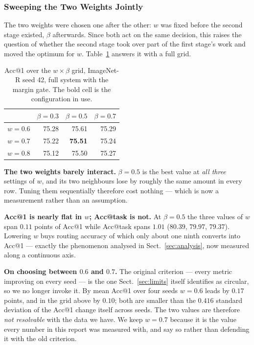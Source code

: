 \documentclass[11pt,a4paper]{article}
\begin{document}
\subsubsection{Sweeping the Two Weights Jointly}

The two weights were chosen one after the other: $w$ was fixed before the second
stage existed, $\beta$ afterwards. Since both act on the same decision, this
raises the question of whether the second stage took over part of the first
stage's work and moved the optimum for $w$. Table~\ref{tab:joint} answers it
with a full grid.

\begin{table}[htbp]
\centering
\caption{Acc@1 over the $w \times \beta$ grid, ImageNet-R seed 42, full system
with the margin gate. The bold cell is the configuration in use.}
\label{tab:joint}
\begin{tabular}{@{}lrrr@{}}
\toprule
 & $\beta = 0.3$ & $\beta = 0.5$ & $\beta = 0.7$ \\
\midrule
$w = 0.6$ & 75.28 & 75.61 & 75.29 \\
$w = 0.7$ & 75.22 & \textbf{75.51} & 75.24 \\
$w = 0.8$ & 75.12 & 75.50 & 75.27 \\
\bottomrule
\end{tabular}
\end{table}

\textbf{The two weights barely interact.} $\beta = 0.5$ is the best value at
\emph{all three} settings of $w$, and its two neighbours lose by roughly the same
amount in every row. Tuning them sequentially therefore cost nothing --- which is
now a measurement rather than an assumption.

\textbf{Acc@1 is nearly flat in $w$; Acc@task is not.} At $\beta = 0.5$ the three
values of $w$ span $0.11$ points of Acc@1 while Acc@task spans $1.01$ ($80.39$,
$79.97$, $79.37$). Lowering $w$ buys routing accuracy of which only about
one ninth converts into Acc@1 --- exactly the phenomenon analysed in
Sect.~\ref{sec:analysis}, now measured along a continuous axis.

\textbf{On choosing between $0.6$ and $0.7$.} The original criterion --- every
metric improving on every seed --- is the one Sect.~\ref{sec:limits} itself
identifies as circular, so we no longer invoke it. By mean Acc@1 over four seeds
$w = 0.6$ leads by $0.17$ points, and in the grid above by $0.10$; both are
smaller than the $0.416$ standard deviation of the Acc@1 change itself across
seeds. The two values are therefore \emph{not resolvable} with the data we have.
We keep $w = 0.7$ because it is the value every number in this report was
measured with, and say so rather than defending it with the old criterion.
\end{document}
